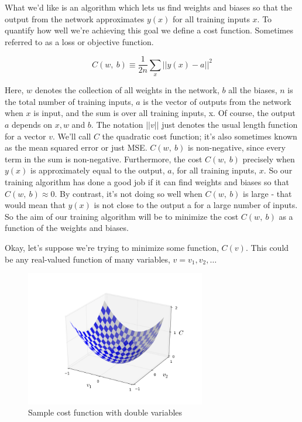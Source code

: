 \documentclass[12 pt]{article}
\begin{document}
What we'd like is an algorithm which lets us find weights and biases so
that the output from the network approximates $ y(x) $ for all
training inputs $ x $. To quantify how well we're achieving this goal
we define a cost function. Sometimes referred to as a loss or objective
function.

\begin{equation}
    C(w, \ b)\equiv\frac{1}{2n}\sum_x ||y(x) - a||^2
\end{equation}

Here, $ w $ denotes the collection of all weights in the network, $ b $
all the biases, $ n $ is the total number of training inputs, $ a $
is the vector of outputs from the network when $ x $ is input, and
the sum is over all training inputs, x. Of course, the output $ a $
depends on $ x, w $ and $ b $. The notation
$ ||v|| $ just denotes the usual length function for a vector $ v $.
We'll call $ C $ the quadratic cost function; it's also sometimes
known as the mean squared error or just MSE.
$ C(w, \ b) $ is non-negative, since every term in the sum is
non-negative. Furthermore, the cost $ C(w, \ b) $ precisely when $ y(x) $
is approximately equal to the output, $ a $,
for all training inputs, $ x $.
So our training algorithm has done a good job if it can find weights and biases
so that $ C(w, \ b) \approx 0 $. By contrast, it's not doing so well when $ C(w,\ b) $
is large - that would mean that $ y(x) $ is not close to the
output a for a large number of inputs. So the aim of our training
algorithm will be to minimize the cost $ C(w, \ b) $ as a function of
the weights and biases.

Okay, let's suppose we're trying to minimize some function, $ C(v) $.
This could be any real-valued function of many variables, $ v = v_1, v_2, \ldots{} $

\begin{figure}[htp]
\centering
\includegraphics[width=0.7\textwidth]{./figs/valley.png}
\caption{Sample cost function with double variables}
\end{figure}
\end{document}
